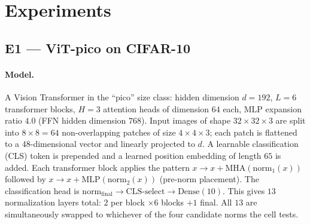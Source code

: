 \documentclass{article}
\begin{document}
\begin{table}[H]
\centering
\caption{Experiment matrix. \textit{Norms} is the number of normalization layers in the model whose type is swapped between the four candidate variants in each cell. \textit{Modes} indicates whether the PARAM\_MATCHED contrast is available; see Section~\ref{sec:variants} for details.}
\label{tab:matrix}
\renewcommand{\arraystretch}{1.15}
\end{table}

\section{Experiments}
\label{sec:experiments}

\subsection{E1 --- ViT-pico on CIFAR-10}
\label{sec:e1}

\paragraph{Model.}
A Vision Transformer in the ``pico'' size class: hidden dimension $d{=}192$, $L{=}6$ transformer blocks, $H{=}3$ attention heads of dimension $64$ each, MLP expansion ratio $4.0$ (FFN hidden dimension $768$).
Input images of shape $32 \times 32 \times 3$ are split into $8 \times 8 = 64$ non-overlapping patches of size $4 \times 4 \times 3$; each patch is flattened to a $48$-dimensional vector and linearly projected to $d$.
A learnable classification (CLS) token is prepended and a learned position embedding of length $65$ is added.
Each transformer block applies the pattern $x \to x + \text{MHA}(\text{norm}_1(x))$ followed by $x \to x + \text{MLP}(\text{norm}_2(x))$ (pre-norm placement).
The classification head is $\text{norm}_{\text{final}} \to \text{CLS-select} \to \text{Dense}(10)$.
This gives $13$ normalization layers total: $2$ per block $\times 6$ blocks $+ 1$ final.
All $13$ are simultaneously swapped to whichever of the four candidate norms the cell tests.
\end{document}
